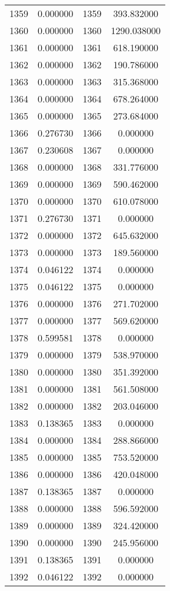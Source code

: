 \documentclass[12pt]{article}
\begin{document}
\begin{longtable}{@{}cccc@{}}
1359 & 0.000000 & 1359 & 393.832000 \\
1360 & 0.000000 & 1360 & 1290.038000 \\
1361 & 0.000000 & 1361 & 618.190000 \\
1362 & 0.000000 & 1362 & 190.786000 \\
1363 & 0.000000 & 1363 & 315.368000 \\
1364 & 0.000000 & 1364 & 678.264000 \\
1365 & 0.000000 & 1365 & 273.684000 \\
1366 & 0.276730 & 1366 & 0.000000 \\
1367 & 0.230608 & 1367 & 0.000000 \\
1368 & 0.000000 & 1368 & 331.776000 \\
1369 & 0.000000 & 1369 & 590.462000 \\
1370 & 0.000000 & 1370 & 610.078000 \\
1371 & 0.276730 & 1371 & 0.000000 \\
1372 & 0.000000 & 1372 & 645.632000 \\
1373 & 0.000000 & 1373 & 189.560000 \\
1374 & 0.046122 & 1374 & 0.000000 \\
1375 & 0.046122 & 1375 & 0.000000 \\
1376 & 0.000000 & 1376 & 271.702000 \\
1377 & 0.000000 & 1377 & 569.620000 \\
1378 & 0.599581 & 1378 & 0.000000 \\
1379 & 0.000000 & 1379 & 538.970000 \\
1380 & 0.000000 & 1380 & 351.392000 \\
1381 & 0.000000 & 1381 & 561.508000 \\
1382 & 0.000000 & 1382 & 203.046000 \\
1383 & 0.138365 & 1383 & 0.000000 \\
1384 & 0.000000 & 1384 & 288.866000 \\
1385 & 0.000000 & 1385 & 753.520000 \\
1386 & 0.000000 & 1386 & 420.048000 \\
1387 & 0.138365 & 1387 & 0.000000 \\
1388 & 0.000000 & 1388 & 596.592000 \\
1389 & 0.000000 & 1389 & 324.420000 \\
1390 & 0.000000 & 1390 & 245.956000 \\
1391 & 0.138365 & 1391 & 0.000000 \\
1392 & 0.046122 & 1392 & 0.000000 \\

\end{longtable}
\end{document}
